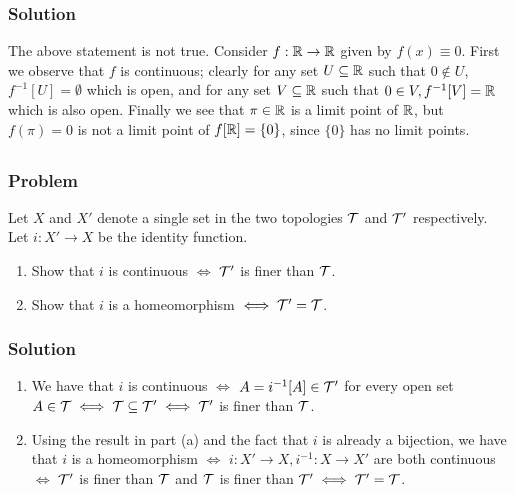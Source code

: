 \subsubsection{Solution}
The above statement is not true. Consider $f : \mathbb R \to \mathbb R$ given by $f(x) \equiv 0$. First we observe that $f$ is continuous; clearly for any set $U \subseteq \mathbb R$ such that $0 \not\in U$, $f^{-1}[U] = \emptyset$ which is open, and for any set $V \subseteq \mathbb R$ such that $0 \in V, f^{-1}[V] = \mathbb R$ which is also open. Finally we see that $\pi \in \mathbb R$ is a limit point of $\mathbb R$, but $f(\pi) = 0$ is not a limit point of $f[\mathbb R] = \{0\}$, since $\{0\}$ has no limit points.


\subsection{}

\subsubsection{Problem}
Let $X$ and $X'$ denote a single set in the two topologies $\mathcal T$ and $\mathcal T'$ respectively. Let $i : X' \to X$ be the identity function. 
\begin{enumerate}
    \item Show that $i$ is continuous $\iff$ $\mathcal T'$ is finer than $\mathcal T$.
    \item Show that $i$ is a homeomorphism $\iff \mathcal T' = \mathcal T$.
\end{enumerate}

\subsubsection{Solution}
\begin{enumerate}
    \item We have that $i$ is continuous $\iff$ $A = i^{-1}[A] \in \mathcal T'$ for every open set $A \in \mathcal T \iff \mathcal T \subseteq \mathcal T' \iff \mathcal T'$ is finer than $\mathcal T$.
    \item Using the result in part (a) and the fact that $i$ is already a bijection, we have that $i$ is a homeomorphism $\iff$ $i : X' \to X, i^{-1} : X \to X'$ are both continuous $\iff$ $\mathcal T'$ is finer than $\mathcal T$ and $\mathcal T$ is finer than $\mathcal T' \iff \mathcal T' = \mathcal T$.
\end{enumerate}


